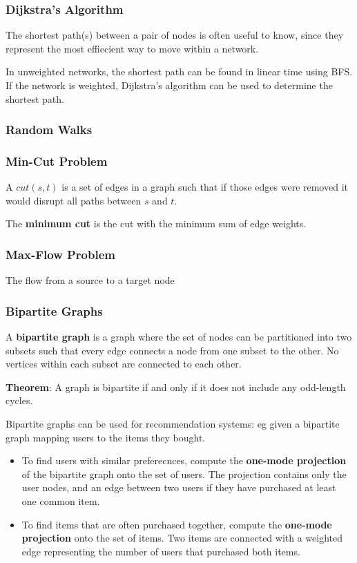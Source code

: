 \documentclass[11pt]{scrartcl} %
\begin{document}
\subsubsection{Dijkstra's Algorithm}
The shortest path(s) between a pair of nodes is often useful to know, since they represent the most effiecient way to move within a network. 

In unweighted networks, the shortest path can be found in linear time using BFS. If the network is weighted, Dijkstra's algorithm can be used to determine the shortest path.

\subsubsection{Random Walks}

\subsubsection{Min-Cut Problem}
A \textbf{$cut(s, t)$} is a set of edges in a graph such that if those edges were removed it would disrupt all paths between $s$ and $t$.

The \textbf{minimum cut} is the cut with the minimum sum of edge weights.

\subsubsection{Max-Flow Problem}
The flow from a source to a target node

\subsubsection{Bipartite Graphs}
A \textbf{bipartite graph} is a graph where the set of nodes can be partitioned into two subsets such that every edge connects a node from one subset to the other. No vertices within each subset are connected to each other.

\textbf{Theorem}: A graph is bipartite if and only if it does not include any odd-length cycles.

Bipartite graphs can be used for recommendation systems: eg given a bipartite graph mapping users to the items they bought. 
\begin{itemize}
	\item To find users with similar preferecnces, compute the \textbf{one-mode projection} of the bipartite graph onto the set of users. The projection contains only the user nodes, and an edge between two users if they have purchased at least one common item. 
	\item To find items that are often purchased together, compute the \textbf{one-mode projection} onto the set of items. Two items are connected with a weighted edge representing the number of users that purchased both items.
\end{itemize}
\end{document}
